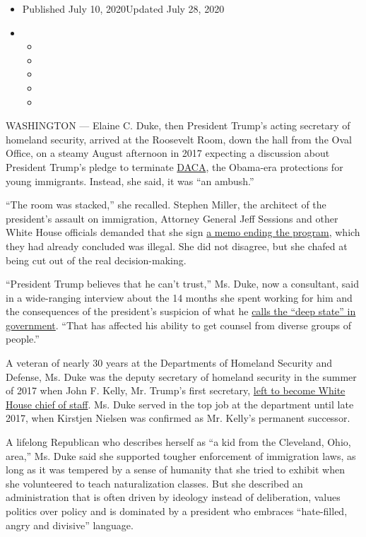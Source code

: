 \begin{itemize}
\item
  Published July 10, 2020Updated July 28, 2020
\item
  \begin{itemize}
  \item
  \item
  \item
  \item
  \item
  \end{itemize}
\end{itemize}

WASHINGTON --- Elaine C. Duke, then President Trump's acting secretary
of homeland security, arrived at the Roosevelt Room, down the hall from
the Oval Office, on a steamy August afternoon in 2017 expecting a
discussion about President Trump's pledge to terminate
\href{https://www.nytimes.com/2020/07/28/us/politics/trump-daca.html}{DACA},
the Obama-era protections for young immigrants. Instead, she said, it
was ``an ambush.''

``The room was stacked,'' she recalled. Stephen Miller, the architect of
the president's assault on immigration, Attorney General Jeff Sessions
and other White House officials demanded that she sign
\href{https://www.nytimes.com/2017/09/05/us/politics/trump-daca-dreamers-immigration.html}{a
memo ending the program}, which they had already concluded was illegal.
She did not disagree, but she chafed at being cut out of the real
decision-making.

``President Trump believes that he can't trust,'' Ms. Duke, now a
consultant, said in a wide-ranging interview about the 14 months she
spent working for him and the consequences of the president's suspicion
of what he
\href{https://www.nytimes.com/2020/02/11/us/politics/trump-vindman.html}{calls
the ``deep state'' in government}. ``That has affected his ability to
get counsel from diverse groups of people.''

A veteran of nearly 30 years at the Departments of Homeland Security and
Defense, Ms. Duke was the deputy secretary of homeland security in the
summer of 2017 when John F. Kelly, Mr. Trump's first secretary,
\href{https://www.nytimes.com/2017/07/28/us/politics/john-kelly-chief-of-staff-donald-trump.html}{left
to become White House chief of staff}. Ms. Duke served in the top job at
the department until late 2017, when Kirstjen Nielsen was confirmed as
Mr. Kelly's permanent successor.

A lifelong Republican who describes herself as ``a kid from the
Cleveland, Ohio, area,'' Ms. Duke said she supported tougher enforcement
of immigration laws, as long as it was tempered by a sense of humanity
that she tried to exhibit when she volunteered to teach naturalization
classes. But she described an administration that is often driven by
ideology instead of deliberation, values politics over policy and is
dominated by a president who embraces ``hate-filled, angry and
divisive'' language.

